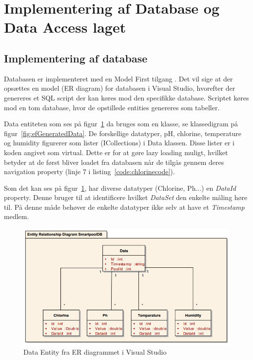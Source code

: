 \section{Implementering af Database og Data Access laget}

\subsection{Implementering af database}

Databasen er implementeret med en Model First tilgang \cite{microsoftdatadevelopercenter2016}. Det vil sige at der opsættes en model (ER diagram) for databasen i Visual Studio, hvorefter der genereres et SQL script der kan køres mod den specifikke database. Scriptet køres mod en tom database, hvor de opstillede entities genereres som tabeller.

Data entiteten som ses på figur~\ref{fig:datasetentity} da bruges som en klasse, se klassedigram på figur~\ref{fig:efGeneratedData}. De forskellige datatyper, pH, chlorine, temperature og humidity figurerer som lister (ICollections) i Data klassen. Disse lister er i koden angivet som virtual. Dette er for at gøre lazy loading muligt, hvilket betyder at de først bliver loadet fra databasen når de tilgås gennem deres navigation property \cite{microsoftdevelopernetwork2016} (linje 7 i listing~\ref{code:chlorinecode}).

Som det kan ses på figur~\ref{fig:datasetentity}, har diverse datatyper (Chlorine, Ph...) en \textit{DataId} property. Denne bruger til at identificere hvilket \textit{DataSet} den enkelte måling høre til. På denne måde behøver de enkelte datatyper ikke selv at have et \textit{Timestamp} medlem. 

\begin{figure}[h]
	\centering
	\includegraphics[width=0.8\linewidth]{figs/implementering/datasetentity.png}
	\caption{Data Entity fra ER diagrammet i Visual Studio}
	\label{fig:datasetentity}
\end{figure}

